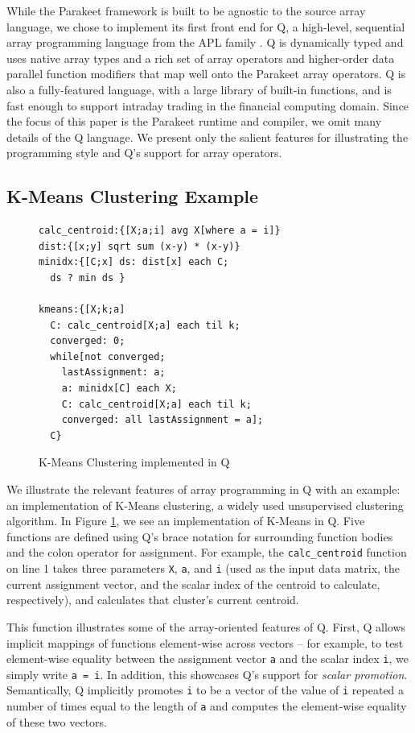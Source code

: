\documentclass[preprint]{sigplanconf}
\begin{document}
While the Parakeet framework is built to be agnostic to the source array language, we chose to implement its first front end for Q, a high-level, sequential array programming language from the APL family \cite{Borr08}. Q is dynamically typed and uses native array types and a rich set of array operators and higher-order data parallel function modifiers that map well onto the Parakeet array operators. Q is also a fully-featured language, with a large library of built-in functions, and is fast enough to support
intraday trading in the financial computing domain. Since the focus of this paper is the Parakeet runtime and compiler, we omit many details of the Q language.  We present only the salient features for illustrating the programming style and Q's support for array operators.

\subsection{K-Means Clustering Example}
\begin{figure}[h!]
\begin{lstlisting}
calc_centroid:{[X;a;i] avg X[where a = i]}
dist:{[x;y] sqrt sum (x-y) * (x-y)}
minidx:{[C;x] ds: dist[x] each C; 
  ds ? min ds }

kmeans:{[X;k;a]
  C: calc_centroid[X;a] each til k;
  converged: 0;
  while[not converged;
    lastAssignment: a;
    a: minidx[C] each X;
    C: calc_centroid[X;a] each til k;
    converged: all lastAssignment = a];
  C}
\end{lstlisting}
\caption{K-Means Clustering implemented in Q}
\label{QKMeans}
\end{figure}

We illustrate the relevant features of array programming in Q with an example: an implementation of K-Means clustering, a widely used unsupervised clustering algorithm.  In Figure \ref{QKMeans}, we see an implementation of K-Means in Q.  Five functions are defined using Q's brace notation for surrounding function bodies and the colon operator for assignment. For example, the \texttt{calc\_centroid} function on line 1 takes three parameters \texttt{X}, \texttt{a}, and \texttt{i} (used as the input data matrix, the
current assignment vector, and the scalar index of the centroid to calculate, respectively), and calculates that cluster's current centroid.

This function illustrates some of the array-oriented features of Q. First, Q allows implicit mappings of functions element-wise across vectors -- for example, to test element-wise equality between the assignment
vector \texttt{a} and the scalar index \texttt{i}, we simply write \texttt{a = i}.  In addition, this showcases Q's support for \emph{scalar promotion}.  Semantically, Q implicitly promotes \texttt{i} to be a vector of the value of \texttt{i} repeated a number of times equal to the length of \texttt{a} and computes the element-wise equality of these two vectors.
\end{document}
